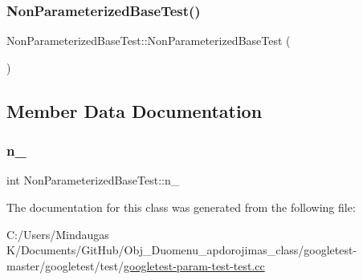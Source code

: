 \subsubsection{\texorpdfstring{NonParameterizedBaseTest()}{NonParameterizedBaseTest()}\hspace{0.1cm}{\footnotesize\ttfamily [3/3]}}
{\footnotesize\ttfamily Non\+Parameterized\+Base\+Test\+::\+Non\+Parameterized\+Base\+Test (\begin{DoxyParamCaption}{ }\end{DoxyParamCaption})\hspace{0.3cm}{\ttfamily [inline]}}



\subsection{Member Data Documentation}
\mbox{\label{class_non_parameterized_base_test_a617d4bbfd2aa5f6d41eea3089f7ad039}} 
\subsubsection{\texorpdfstring{n\_}{n\_}}
{\footnotesize\ttfamily int Non\+Parameterized\+Base\+Test\+::n\+\_\+\hspace{0.3cm}{\ttfamily [protected]}}



The documentation for this class was generated from the following file\+:\begin{DoxyCompactItemize}
\item 
C\+:/\+Users/\+Mindaugas K/\+Documents/\+Git\+Hub/\+Obj\+\_\+\+Duomenu\+\_\+apdorojimas\+\_\+class/googletest-\/master/googletest/test/\mbox{\hyperlink{googletest-master_2googletest_2test_2googletest-param-test-test_8cc}{googletest-\/param-\/test-\/test.\+cc}}\end{DoxyCompactItemize}
